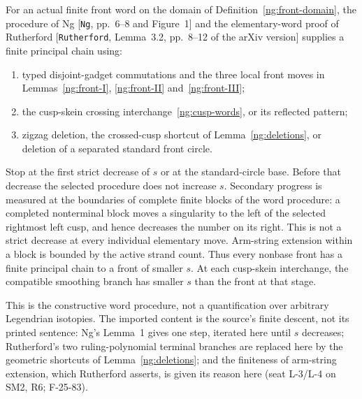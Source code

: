 \begin{literature}\label{ng:finite-word}\leanok{}
For an actual finite front word on the domain of
Definition~\ref{ng:front-domain}, the procedure of Ng
\textnormal{[\texttt{Ng}, pp.~6--8 and Figure~1]} and the elementary-word proof of
Rutherford \textnormal{[\texttt{Rutherford}, Lemma~3.2, pp.~8--12 of the arXiv version]}
supplies a finite principal chain using:
\begin{enumerate}
\item typed disjoint-gadget commutations and the three local front moves
  in Lemmas~\ref{ng:front-I}, \ref{ng:front-II} and~\ref{ng:front-III};
\item the cusp-skein crossing interchange~\eqref{ng:cusp-words}, or its
  reflected pattern;
\item zigzag deletion, the crossed-cusp shortcut of
  Lemma~\ref{ng:deletions}, or deletion of a separated standard front
  circle.
\end{enumerate}
Stop at the first strict decrease of $s$ or at the standard-circle base.
Before that decrease the selected procedure does not increase $s$.
Secondary progress is measured at the boundaries of complete finite
blocks of the word procedure: a completed nonterminal block moves a
singularity to the left of the selected rightmost left cusp, and hence
decreases the number on its right. This is not a strict decrease at
every individual elementary move. Arm-string extension within a block
is bounded by the active strand count. Thus every nonbase front has a
finite principal chain to a front of smaller $s$. At each cusp-skein
interchange, the compatible smoothing branch has smaller $s$ than the
front at that stage.

This is the constructive word procedure, not a quantification over
arbitrary Legendrian isotopies. The imported content is the source's finite
descent, not its printed sentence: Ng's Lemma~1 gives one step, iterated
here until $s$ decreases; Rutherford's two ruling-polynomial terminal
branches are replaced here by the geometric shortcuts of
Lemma~\ref{ng:deletions}; and the finiteness of arm-string extension, which
Rutherford asserts, is given its reason here (seat L-3/L-4 on SM2, R6;
F-25-83).

\end{literature}

